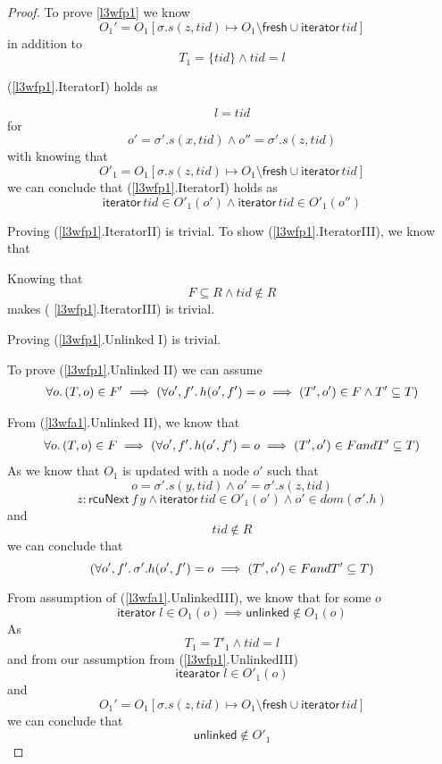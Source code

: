 \begin{proof}
To prove \ref{l3wfp1} we know 
\[O_{1}' = O_{1}[\sigma.s(z,tid) \mapsto O_{1} \setminus \mathsf{fresh}  \cup \mathsf{iterator} \, tid ] \]
in addition to
\[T_{1}=\{tid\} \land tid= l\]

(\ref{l3wfp1}.\textsf{IteratorI}) holds as 

\[ l =  tid \] for
\[ o' = \sigma'.s(x,tid) \land o'' = \sigma'.s(z,tid) \] with knowing that
\[O'_{1} = O_{1}[\sigma.s(z,tid) \mapsto O_{1}  \setminus \mathsf{fresh}  \cup \mathsf{iterator} \, tid]\]
we can conclude that (\ref{l3wfp1}.\textsf{IteratorI}) holds as  
\[ \textsf{iterator} \, tid \in O'_{1}(o') \land \textsf{iterator} \, tid \in O'_{1}(o'') \]

Proving (\ref{l3wfp1}.\textsf{IteratorII})  is trivial.
 To show (\ref{l3wfp1}.\textsf{IteratorIII}), we know that 

Knowing that \[F \subseteq R\land tid \notin R\] makes ( \ref{l3wfp1}.\textsf{IteratorIII}) is trivial.

Proving (\ref{l3wfp1}.\textsf{Unlinked I}) is trivial.

To prove (\ref{l3wfp1}.\textsf{Unlinked II}) we can assume 
\begin{gather} \forall o \ldotp (T,o) \in F' \implies (\forall o',f' \ldotp h(o',f') = o \implies (T',o') \in F \land T' \subseteq T) \end{gather}

From (\ref{l3wfa1}.\textsf{Unlinked II}), we know that 
\begin{gather} \forall o \ldotp (T,o) \in F \implies (\forall o',f' \ldotp h(o',f') = o \implies (T',o') \in F and T' \subseteq T) \end{gather}
As we know that  $O_{1}$  is updated with a node $o'$ such that 
 \[o=\sigma'.s(y,tid) \land  o' = \sigma'.s(z,tid)   \]
\[z:\mathsf{rcuNext}\,f \, y \land \mathsf{iterator} \, tid \in O'_{1}(o') \land o' \in dom(\sigma'.h) \]
and 
\[tid \notin R \]
we can conclude that 
\[ (\forall o',f' \ldotp \sigma'.h(o',f') = o \implies (T',o') \in F and T' \subseteq T) \]

From assumption of (\ref{l3wfa1}.\textsf{UnlinkedIII}), we know that for some $o$ 
\[ \mathsf{iterator} \; l \in O_{1}(o) \implies \mathsf{unlinked} \notin O_{1}(o)\]
As 
\[ T_{1} = T'_{1} \land tid = l \] and from our assumption from (\ref{l3wfp1}.\textsf{UnlinkedIII})
\[\mathsf{itearator} \; l \in O'_{1}(o) \] and
\[ O_{1}' = O_{1}[\sigma.s(z,tid) \mapsto O_{1} \setminus \mathsf{fresh}  \cup \mathsf{iterator} \, tid ] \] 
we can conclude that 
\[ \mathsf{unlinked} \notin O'_{1} \]  


\end{proof}
